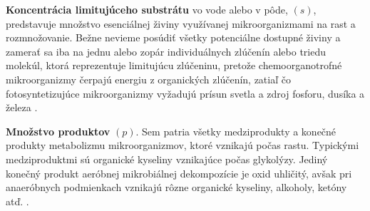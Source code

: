 \textbf{Koncentrácia limitujúceho substrátu} vo vode alebo v pôde, $(s)$, predstavuje množstvo esenciálnej živiny využívanej mikroorganizmami na rast a rozmnožovanie. Bežne nevieme posúdiť všetky potenciálne dostupné živiny a zamerať sa iba na jednu alebo zopár individuálnych zlúčenín alebo triedu molekúl, ktorá reprezentuje limitujúcu zlúčeninu, pretože chemoorganotrofné mikroorganizmy čerpajú energiu z organických zlúčenín, zatiaľ čo fotosyntetizujúce mikroorganizmy vyžadujú prísun svetla a zdroj fosforu, dusíka a železa \cite{panikov:kinetics_MO_processes:2016}.

\textbf{Množstvo produktov} $(p)$. Sem patria všetky medziprodukty a konečné produkty metabolizmu mikroorganizmov, ktoré vznikajú počas rastu. Typickými medziproduktmi sú organické kyseliny vznikajúce počas glykolýzy. Jediný konečný produkt aeróbnej mikrobiálnej dekompozície je oxid uhličitý, avšak pri anaeróbnych podmienkach vznikajú rôzne organické kyseliny, alkoholy, ketóny atď. \cite{panikov:kinetics_MO_processes:2016}.